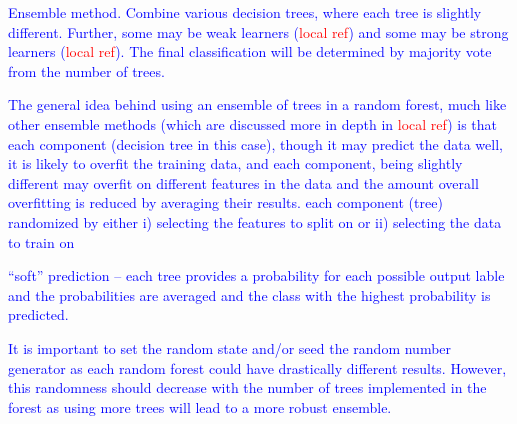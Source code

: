 \textcolor{blue}{Ensemble method. Combine various decision trees, where each tree is slightly different. Further, some may be weak learners (\textcolor{red}{local ref}) and some may be strong learners (\textcolor{red}{local ref}). The final classification will be determined by majority vote from the number of trees.}

\textcolor{blue}{The general idea behind using an ensemble of trees in a random forest, much like other ensemble methods (which are discussed more in depth in \textcolor{red}{local ref}) is that each component (decision tree in this case), though it may predict the data well, it is likely to overfit the training data, and each component, being slightly different may overfit on different features in the data and the amount overall overfitting is reduced by averaging their results.  each component (tree) randomized by either i) selecting the features to split on or ii) selecting the data to train on}

\textcolor{blue}{``soft'' prediction -- each tree provides a probability for each possible output lable and the probabilities are averaged and the class with the highest probability is predicted.}

\textcolor{blue}{It is important to set the random state and/or seed the random number generator as each random forest could have drastically different results. However, this randomness should decrease with the number of trees implemented in the forest as using more trees will lead to a more robust ensemble.}



